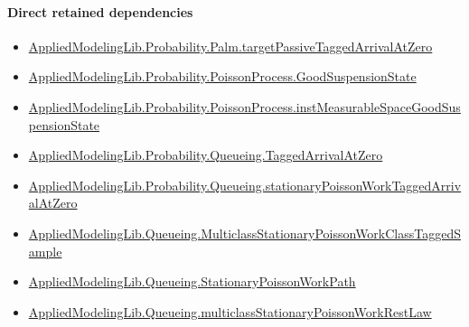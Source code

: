 \documentclass[10pt]{article}
\begin{document}
\paragraph{Direct retained dependencies}
\begin{itemize}\raggedright
\item \hyperlink{governing-declaration-5a10835f452c324b}{Applied\allowbreak{}Modeling\allowbreak{}Lib.\allowbreak{}Probability.\allowbreak{}Palm.\allowbreak{}target\allowbreak{}Passive\allowbreak{}Tagged\allowbreak{}Arrival\allowbreak{}At\allowbreak{}Zero}
\item \hyperlink{governing-declaration-ab1cfe37ad8c32b0}{Applied\allowbreak{}Modeling\allowbreak{}Lib.\allowbreak{}Probability.\allowbreak{}Poisson\allowbreak{}Process.\allowbreak{}Good\allowbreak{}Suspension\allowbreak{}State}
\item \hyperlink{governing-declaration-a8385d799d0a4d16}{Applied\allowbreak{}Modeling\allowbreak{}Lib.\allowbreak{}Probability.\allowbreak{}Poisson\allowbreak{}Process.\allowbreak{}inst\allowbreak{}Measurable\allowbreak{}Space\allowbreak{}Good\allowbreak{}Suspension\allowbreak{}State}
\item \hyperlink{governing-declaration-a69bedb5b0d420c6}{Applied\allowbreak{}Modeling\allowbreak{}Lib.\allowbreak{}Probability.\allowbreak{}Queueing.\allowbreak{}Tagged\allowbreak{}Arrival\allowbreak{}At\allowbreak{}Zero}
\item \hyperlink{governing-declaration-e9116e504d73a45c}{Applied\allowbreak{}Modeling\allowbreak{}Lib.\allowbreak{}Probability.\allowbreak{}Queueing.\allowbreak{}stationary\allowbreak{}Poisson\allowbreak{}Work\allowbreak{}Tagged\allowbreak{}Arrival\allowbreak{}At\allowbreak{}Zero}
\item \hyperlink{library-prerequisite-755cdb28ceaf46d2}{Applied\allowbreak{}Modeling\allowbreak{}Lib.\allowbreak{}Queueing.\allowbreak{}Multiclass\allowbreak{}Stationary\allowbreak{}Poisson\allowbreak{}Work\allowbreak{}Class\allowbreak{}Tagged\allowbreak{}Sample}
\item \hyperlink{governing-declaration-62a268164b6ae28b}{Applied\allowbreak{}Modeling\allowbreak{}Lib.\allowbreak{}Queueing.\allowbreak{}Stationary\allowbreak{}Poisson\allowbreak{}Work\allowbreak{}Path}
\item \hyperlink{governing-declaration-9bede4eaca6a95fb}{Applied\allowbreak{}Modeling\allowbreak{}Lib.\allowbreak{}Queueing.\allowbreak{}multiclass\allowbreak{}Stationary\allowbreak{}Poisson\allowbreak{}Work\allowbreak{}Rest\allowbreak{}Law}
\end{itemize}
\end{document}

